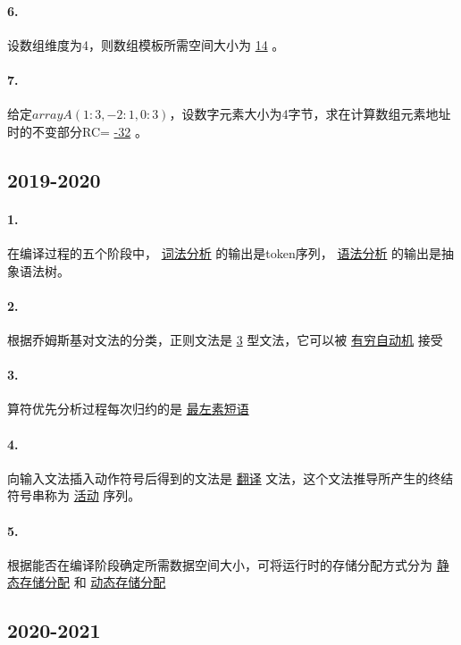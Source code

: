 \documentclass[UTF8]{ctexart} %
\begin{document}
\paragraph{6.} 设数组维度为4，则数组模板所需空间大小为 \underline{14} 。

\paragraph{7.} 给定$array A(1:3,-2:1,0:3)$，设数字元素大小为4字节，求在计算数组元素地址时的不变部分RC= \underline{-32} 。

\subsection{2019-2020}

\paragraph{1.} 在编译过程的五个阶段中， \underline{词法分析} 的输出是token序列， \underline{语法分析} 的输出是抽象语法树。

\paragraph{2.} 根据乔姆斯基对文法的分类，正则文法是 \underline{3} 型文法，它可以被 \underline{有穷自动机} 接受

\paragraph{3.} 算符优先分析过程每次归约的是 \underline{最左素短语}

\paragraph{4.} 向输入文法插入动作符号后得到的文法是 \underline{翻译} 文法，这个文法推导所产生的终结符号串称为 \underline{活动} 序列。

\paragraph{5.} 根据能否在编译阶段确定所需数据空间大小，可将运行时的存储分配方式分为 \underline{静态存储分配} 和 \underline{动态存储分配}

\subsection{2020-2021}
\end{document}
